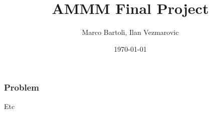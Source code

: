 \documentclass{beamer}
\title{AMMM Final Project}
\author{Marco Bartoli, Ilan Vezmarovic}
\institute{UPC Universitat Politècnica de Catalunya}
\date{\today}
\begin{document}
\frame{\titlepage}

\begin{frame}
\frametitle{Problem}
Etc
\end{frame}
\end{document}
